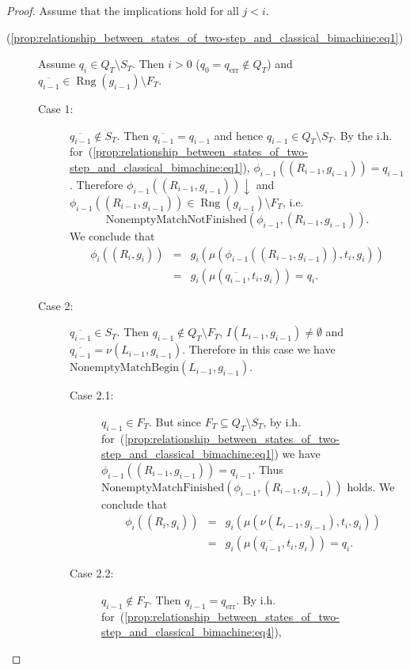 \documentclass{article}
\DeclareMathOperator{\Rng}{Rng}
\begin{document}
	\begin{proof}
		Assume that the implications hold for all $j<i$.
		\begin{description}
			\item[(\ref{prop:relationship_between_states_of_two-step_and_classical_bimachine:eq1})]
				Assume $q_i\in Q_T\setminus S_T$. Then $i>0$ ($q_0 = q_\mathrm{err}\notin Q_T$) and
				$\overline{q_{i-1}}\in \Rng(g_{i-1})\setminus F_T$.
				\begin{description}
				\item[Case 1:] $\overline{q_{i-1}}\notin S_T$.
					Then $\overline{q_{i-1}} = q_{i-1}$ and hence $q_{i-1}\in Q_T\setminus S_T$.
					By the i.h. for~(\ref{prop:relationship_between_states_of_two-step_and_classical_bimachine:eq1}),
					$\phi_{i-1}((R_{i-1}, g_{i-1})) = q_{i-1}$.
					Therefore $\phi_{i-1}((R_{i-1}, g_{i-1}))\downarrow$ and $\phi_{i-1}((R_{i-1}, g_{i-1}))\in \Rng(g_{i-1})\setminus F_T$, i.e.
					\[ \mathrm{NonemptyMatchNotFinished}(\phi_{i-1}, (R_{i-1}, g_{i-1})). \]
					We conclude that
					\begin{eqnarray*}
						\phi_i((R_i, g_i)) &=& g_i(\mu(\phi_{i-1}((R_{i-1}, g_{i-1})), t_i, g_i)) \\
							&=& g_i(\mu(\overline{q_{i-1}}, t_i, g_i)) = q_i.
					\end{eqnarray*}
				\item[Case 2:] $\overline{q_{i-1}}\in S_T$.
					Then $q_{i-1}\notin Q_T\setminus F_T$, $I(L_{i-1}, g_{i-1})\ne\emptyset$ and $\overline{q_{i-1}} = \nu(L_{i-1}, g_{i-1})$. Therefore in this case we have $\mathrm{NonemptyMatchBegin}(L_{i-1}, g_{i-1})$.
					\begin{description}
					\item[Case 2.1:] $q_{i-1}\in F_T$.
						But since $F_T\subseteq Q_T\setminus S_T$, by i.h. for~(\ref{prop:relationship_between_states_of_two-step_and_classical_bimachine:eq1}) we have $\phi_{i-1}((R_{i-1}, g_{i-1})) = q_{i-1}$.
						Thus $\mathrm{NonemptyMatchFinished}(\phi_{i-1}, (R_{i-1}, g_{i-1}))$ holds.
						We conclude that
						\begin{eqnarray*}
							\phi_i((R_i, g_i)) &=& g_i(\mu(\nu(L_{i-1}, g_{i-1}), t_i, g_i)) \\
							&=& g_i(\mu(\overline{q_{i-1}}, t_i, g_i)) = q_i.
						\end{eqnarray*}
					\item[Case 2.2:] $q_{i-1}\notin F_T$. Then $q_{i-1} = q_\mathrm{err}$.
						By i.h. for~(\ref{prop:relationship_between_states_of_two-step_and_classical_bimachine:eq4}),

\end{description}
\end{description}
\end{description}
\end{proof}
\end{document}
